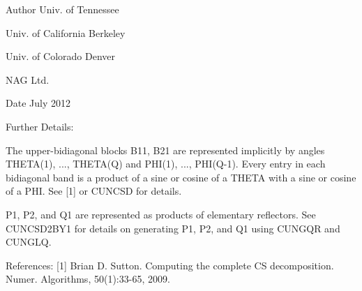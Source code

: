 \begin{DoxyAuthor}{Author}
Univ. of Tennessee 

Univ. of California Berkeley 

Univ. of Colorado Denver 

N\+A\+G Ltd. 
\end{DoxyAuthor}
\begin{DoxyDate}{Date}
July 2012 
\end{DoxyDate}
\begin{DoxyParagraph}{Further Details\+: }

\end{DoxyParagraph}
The upper-\/bidiagonal blocks B11, B21 are represented implicitly by angles T\+H\+E\+T\+A(1), ..., T\+H\+E\+T\+A(\+Q) and P\+H\+I(1), ..., P\+H\+I(Q-\/1). Every entry in each bidiagonal band is a product of a sine or cosine of a T\+H\+E\+T\+A with a sine or cosine of a P\+H\+I. See \mbox{[}1\mbox{]} or C\+U\+N\+C\+S\+D for details.

P1, P2, and Q1 are represented as products of elementary reflectors. See C\+U\+N\+C\+S\+D2\+B\+Y1 for details on generating P1, P2, and Q1 using C\+U\+N\+G\+Q\+R and C\+U\+N\+G\+L\+Q.  \begin{DoxyParagraph}{References\+: }
\mbox{[}1\mbox{]} Brian D. Sutton. Computing the complete C\+S decomposition. Numer. Algorithms, 50(1)\+:33-\/65, 2009. 
\end{DoxyParagraph}
